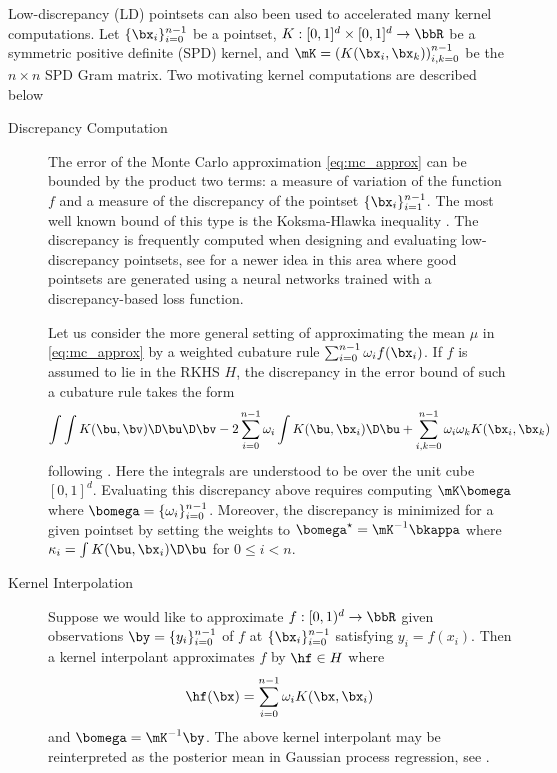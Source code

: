 \documentclass[acmsmall]{acmart}
\begin{document}
Low-discrepancy (LD) pointsets can also been used to accelerated many kernel computations. Let $\{\bx_i\}_{i=0}^{n-1}$ be a pointset, $K: [0,1]^d \times [0,1]^d \to \bbR$ be a symmetric positive definite (SPD) kernel, and $\mK = \left(K(\bx_i,\bx_k)\right)_{i,k=0}^{n-1}$ be the $n \times n$ SPD Gram matrix. Two motivating kernel computations are described below

\begin{description}
    \item[Discrepancy Computation] The error of the Monte Carlo approximation \eqref{eq:mc_approx} can be bounded by the product two terms: a measure of variation of the function $f$ and a measure of the discrepancy of the pointset $\{\bx_i\}_{i=1}^{n-1}$.  The most well known bound of this type is the Koksma-Hlawka inequality \citep{hickernell.generalized_discrepancy_quadrature_error_bound,dick.high_dim_integration_qmc_way,hickernell1999goodness,niederreiter.qmc_book}. The discrepancy is frequently computed when designing and evaluating low-discrepancy pointsets, see \citep{rusch2024message} for a newer idea in this area where good pointsets are generated using a neural networks trained with a discrepancy-based loss function.  
    
    Let us consider the more general setting of approximating the mean $\mu$ in \eqref{eq:mc_approx} by a weighted cubature rule $\sum_{i=0}^{n-1} \omega_i f(\bx_i)$. If $f$ is assumed to lie in the RKHS $H$, the discrepancy in the error bound of such a cubature rule takes the form
    $$\int \int K(\bu,\bv) \D \bu \D \bv - 2 \sum_{i=0}^{n-1} \omega_i \int K(\bu,\bx_i) \D \bu + \sum_{i,k=0}^{n-1} \omega_i \omega_k K(\bx_i,\bx_k)$$
    following \citep{hickernell.generalized_discrepancy_quadrature_error_bound}. Here the integrals are understood to be over the unit cube $[0,1]^d$. Evaluating this discrepancy above requires computing $\mK \bomega$ where $\bomega = \{\omega_i\}_{i=0}^{n-1}$. Moreover, the discrepancy is minimized for a given pointset by setting the weights to $\bomega^\star = \mK^{-1} \bkappa$ where $\kappa_i = \int K(\bu,\bx_i) \D \bu$ for $0 \leq i < n$.
    \item[Kernel Interpolation] Suppose we would like to approximate $f: [0,1)^d \to \bbR$ given observations $\by = \{y_i\}_{i=0}^{n-1}$ of $f$ at $\{\bx_i\}_{i=0}^{n-1}$ satisfying $y_i = f(x_i)$. Then a kernel interpolant approximates $f$ by $\hf \in H$ where 
    $$\hf(\bx) = \sum_{i=0}^{n-1} \omega_i K(\bx,\bx_i)$$
    and $\bomega = \mK^{-1} \by$. The above kernel interpolant may be reinterpreted as the posterior mean in Gaussian process regression, see \citep{rasmussen.gp4ml}.  %
\end{description}
\end{document}
